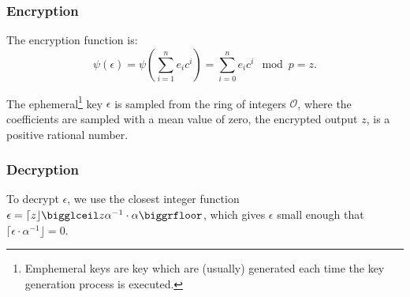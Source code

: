 \subsubsection{Encryption}

The encryption function is:
\[\psi(\epsilon) = \psi \left( \sum_{i=1}^{n}e_{i}c^{i} \right) = \sum_{i=0}^{n} e_{i}c^{i}\mod{p}=z. \]

The ephemeral\footnote{Emphemeral keys are key which are (usually)  generated each time the key generation process is executed. } key $\epsilon$ is sampled from the ring of integers $\mathcal{O}$, where the coefficients are sampled with a mean value of zero, the encrypted output $z$, is a positive rational number.

\subsubsection{Decryption}

To decrypt $\epsilon$, we use the closest integer function $\epsilon = \lceil z \rfloor \bigglceil z\alpha^{-1} \cdot \alpha \biggrfloor$, which gives $\epsilon$ small enough that $\lceil \epsilon \cdot \alpha^{-1}\rfloor = 0$. 

